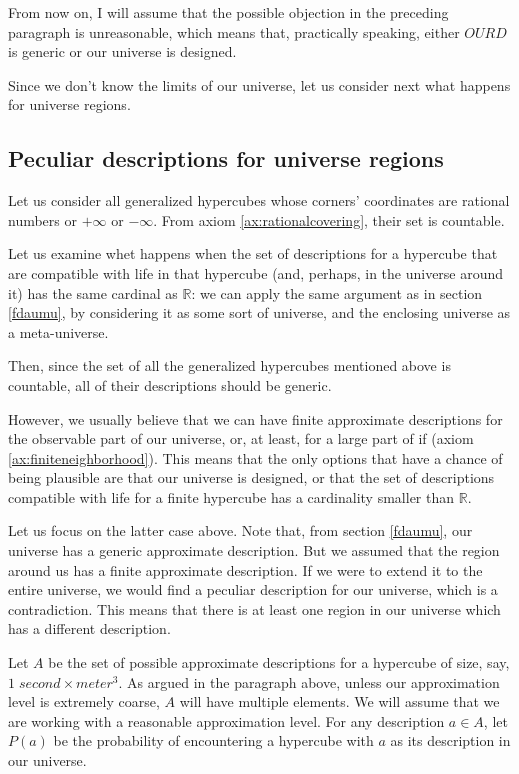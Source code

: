 \documentclass[a4paper
,draft
]{article}
\def\reale{\mathbb{R}}
\def\our_description{OURD}
\begin{document}
From now on, I will assume that the possible objection in the preceding
paragraph is unreasonable, which means that, practically speaking,
either $\our_description$ is generic or our universe is designed.

Since we don't know the limits of our universe, let us consider next
what happens for universe regions.

\subsection{Peculiar descriptions for universe regions}
\label{sec:peculiarregions}

Let us consider all generalized hypercubes whose corners' coordinates are
rational numbers or $+\infty$ or $-\infty$. From axiom
\ref{ax:rationalcovering}, their set is countable.

Let us examine whet happens when the set of descriptions for a hypercube that
are compatible with life in that hypercube (and, perhaps, in the universe
around it) has the same cardinal as $\reale$: we can apply the same argument
as in section \ref{fdaumu}, by considering it as some sort of universe, and the
enclosing universe as a meta-universe.

Then, since the set of all the generalized hypercubes mentioned above is
countable, all of their descriptions should be generic.

However, we usually believe that we can have finite approximate descriptions
for the observable part of our universe, or, at least, for a large part of if
(axiom \ref{ax:finiteneighborhood}).
This means that the only options
that have a chance of being plausible are that our universe is designed, or
that the set of descriptions compatible with life for a finite hypercube
has a cardinality smaller than $\reale$.

Let us focus on the latter case above.
Note that, from section \ref{fdaumu}, our universe has
a generic approximate description.
But we assumed that the region around us has a finite approximate description.
If we were to extend it to the entire universe, we would find a peculiar
description for our universe, which is a contradiction. This means that there
is at least one region in our universe which has a different description.

Let $A$ be the set of possible approximate descriptions for
a hypercube of size, say, $1\;second \times meter^3$.
As argued in the paragraph above,
unless our approximation level is extremely coarse,
$A$ will have multiple elements.
We will assume that we are working with a reasonable approximation level.
For any description $a\in A$, let $P(a)$ be the probability of encountering
a hypercube with $a$ as its description in our universe.
\end{document}
